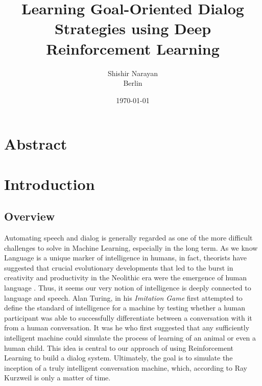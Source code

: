 \documentclass[14pt]{extarticle}
\numberwithin{equation}{section}
\begin{document}
	
	
	
	
	\title{Learning Goal-Oriented Dialog Strategies using Deep Reinforcement Learning}
	\author{Shishir Narayan \\ Berlin}
	\date{\today}
	
	
	
	\maketitle
	\clearpage
	\tableofcontents
	\clearpage
	\setcounter{page}{1}
	
	\section{Abstract}
	
	\section{Introduction}
	\subsection{Overview}
	Automating speech and dialog is generally regarded as one of the more difficult challenges to solve in Machine Learning, especially in the long term. As we know Language is a unique marker of intelligence in humans, in fact, theorists have suggested that crucial evolutionary developments that led to the burst in creativity and productivity in the Neolithic era were the emergence of human language \cite{macwhinne_lang_evol}. 	
	Thus, it seems our very notion of intelligence is deeply connected to language and speech. Alan Turing, in his \textit{Imitation Game} \cite{turing_mind} first attempted to define the standard of intelligence for a machine by testing whether a human participant was able to successfully differentiate between a conversation with it from a human conversation. It was he who first suggested that any sufficiently intelligent machine could simulate the process of learning of an animal or even a human child. This idea is central to our approach of using Reinforcement Learning to build a dialog system. Ultimately, the goal is to simulate the inception of a truly intelligent conversation machine, which, according to Ray Kurzweil \cite{kurzweil_sing} is only a matter of time. \par
	
\end{document}
